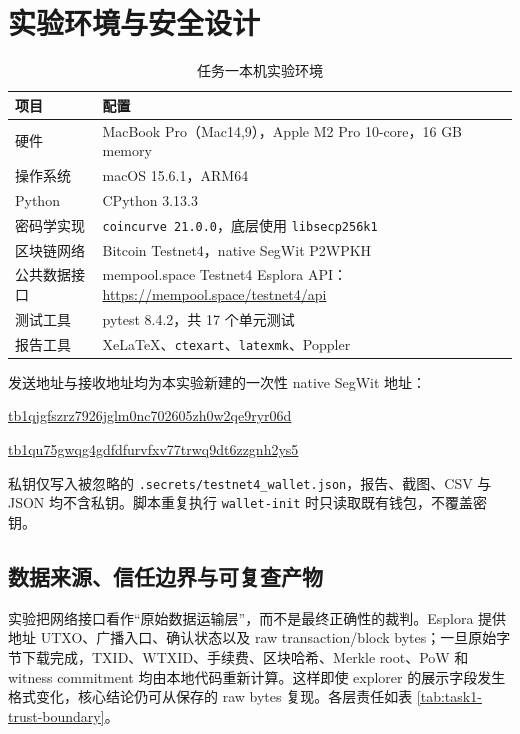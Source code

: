 \documentclass[11pt,a4paper,fontset=none]{ctexart}
\begin{document}
\section{实验环境与安全设计}

\begin{table}[H]
\centering
\caption{任务一本机实验环境}
\label{tab:task1-environment}
\begin{tabular}{p{}p{}}
\toprule
项目 & 配置 \\
\midrule
硬件 & MacBook Pro（Mac14,9），Apple M2 Pro 10-core，16 GB memory \\
操作系统 & macOS 15.6.1，ARM64 \\
Python & CPython 3.13.3 \\
密码学实现 & \texttt{coincurve 21.0.0}，底层使用 \texttt{libsecp256k1} \\
区块链网络 & Bitcoin Testnet4，native SegWit P2WPKH \\
公共数据接口 & mempool.space Testnet4 Esplora API：\url{https://mempool.space/testnet4/api} \\
测试工具 & pytest 8.4.2，共 17 个单元测试 \\
报告工具 & XeLaTeX、\texttt{ctexart}、\texttt{latexmk}、Poppler \\
\bottomrule
\end{tabular}
\end{table}

发送地址与接收地址均为本实验新建的一次性 native SegWit 地址：

\begin{description}[style=nextline]
  \item[Sender] \url{tb1qjgfszrz7926jglm0nc702605zh0w2qe9ryr06d}
  \item[Receiver] \url{tb1qu75gwqg4gdfdfurvfxv77trwq9dt6zzgnh2ys5}
\end{description}

私钥仅写入被忽略的 \texttt{.secrets/testnet4\_wallet.json}，报告、截图、CSV 与 JSON 均不含私钥。脚本重复执行 \texttt{wallet-init} 时只读取既有钱包，不覆盖密钥。

\subsection{数据来源、信任边界与可复查产物}

实验把网络接口看作“原始数据运输层”，而不是最终正确性的裁判。Esplora 提供地址 UTXO、广播入口、确认状态以及 raw transaction/block bytes；一旦原始字节下载完成，TXID、WTXID、手续费、区块哈希、Merkle root、PoW 和 witness commitment 均由本地代码重新计算。这样即使 explorer 的展示字段发生格式变化，核心结论仍可从保存的 raw bytes 复现。各层责任如表 \ref{tab:task1-trust-boundary}。
\end{document}

